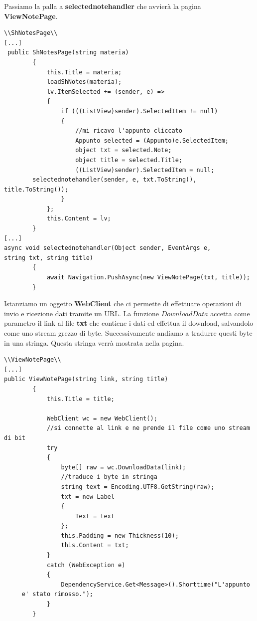 \documentclass[a4paper, 50pt, twoside]{article}
\begin{document}
Passiamo la palla a \textbf{selectednotehandler} che avvierà la pagina \textbf{ViewNotePage}.
\newpage
\begin{lstlisting}
\\ShNotesPage\\
[...]
 public ShNotesPage(string materia)
        {
            this.Title = materia;
            loadShNotes(materia);
            lv.ItemSelected += (sender, e) =>
            {
                if (((ListView)sender).SelectedItem != null)
                {
                    //mi ricavo l'appunto cliccato
                    Appunto selected = (Appunto)e.SelectedItem;
                    object txt = selected.Note;
                    object title = selected.Title;
                    ((ListView)sender).SelectedItem = null; 
		selectednotehandler(sender, e, txt.ToString(), title.ToString());
                }
            };
            this.Content = lv;
        }
[...]
async void selectednotehandler(Object sender, EventArgs e, 
string txt, string title)
        {
            await Navigation.PushAsync(new ViewNotePage(txt, title));
        }
\end{lstlisting}
Istanziamo un oggetto \textbf{WebClient} che ci permette di effettuare operazioni di invio e ricezione dati tramite un URL. La funzione $DownloadData$ accetta come parametro il link al file \textbf{txt} che contiene i dati ed effettua il download, salvandolo come uno stream grezzo di byte. Successivamente andiamo a tradurre questi byte in una stringa. Questa stringa verrà mostrata nella pagina. 
\begin{lstlisting}
\\ViewNotePage\\
[...]
public ViewNotePage(string link, string title)
        {
            this.Title = title;

            WebClient wc = new WebClient();
            //si connette al link e ne prende il file come uno stream di bit
            try
            {
                byte[] raw = wc.DownloadData(link);
                //traduce i byte in stringa  
                string text = Encoding.UTF8.GetString(raw);
                txt = new Label
                {
                    Text = text
                };
                this.Padding = new Thickness(10);
                this.Content = txt;
            }
            catch (WebException e)
            {
                DependencyService.Get<Message>().Shorttime("L'appunto
	 e' stato rimosso.");
            }     
        }
\end{lstlisting}
\end{document}
